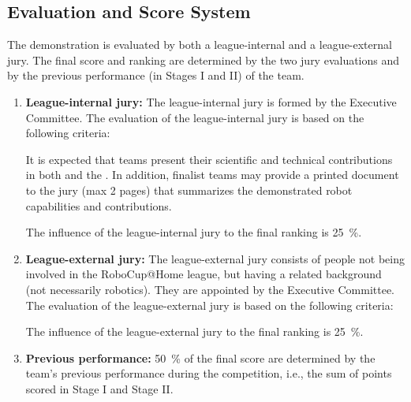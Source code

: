 \subsection{Evaluation and Score System}
The demonstration is evaluated by both a league-internal and a league-external jury.
The final score and ranking are determined by the two jury evaluations and by the previous performance (in Stages I and II) of the team.
\begin{enumerate}
\item\textbf{League-internal jury:} The league-internal jury is formed by the Executive Committee.
The evaluation of the league-internal jury is based on the following criteria:
It is expected that teams present their scientific and technical contributions in both  and the .
In addition, finalist teams may provide a printed document to the jury (max 2 pages) that summarizes the demonstrated robot capabilities and contributions.  

  The influence of the league-internal jury to the final ranking is \SI{25}{\percent}.

\item \textbf{League-external jury:} The league-external jury consists of people not being involved in the RoboCup@Home league,
but having a related background (not necessarily robotics).
They are appointed by the Executive Committee.
The evaluation of the league-external jury is based on the following criteria:
  The influence of the league-external jury to the final ranking is \SI{25}{\percent}.

\item \textbf{Previous performance:} \SI{50}{\percent} of the final score are determined by the team's previous performance during the competition, i.e., 
the sum of points scored in Stage I and Stage II.
\end{enumerate}

